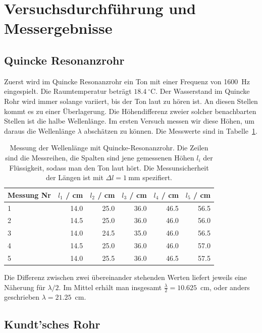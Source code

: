 \documentclass{article}
\begin{document}
\newpage
\section{Versuchsdurchführung und Messergebnisse}


\subsection{Quincke Resonanzrohr}

Zuerst wird im Quincke Resonanzrohr ein Ton mit einer Frequenz von 1600~Hz eingespielt. Die Raumtemperatur beträgt $18.4~^\circ$C. Der Wasserstand im Quincke Rohr wird immer solange variiert, bis der Ton laut zu hören ist. An diesen Stellen kommt es zu einer Überlagerung. Die Höhendifferenz zweier solcher benachbarten Stellen ist die halbe Wellenlänge. Im ersten Versuch messen wir diese Höhen, um daraus die Wellenlänge $\lambda$ abschätzen zu können. Die Messwerte sind in Tabelle~\ref{tab:quincke_rohr}.

\begin{table}[H]
\caption{Messung der Wellenlänge mit Quincke-Resonanzrohr. Die Zeilen sind die Messreihen, die Spalten sind jene gemessenen Höhen $l_i$ der Flüssigkeit, sodass man den Ton laut hört. Die Messunsicherheit der Längen ist mit $\Delta l = 1~$mm spezifiert.}
\label{tab:quincke_rohr}
\begin{tabular}{l|rrrrr}
Messung Nr & $l_1$ / cm & $l_2$ / cm  &  $l_3$ / cm  &  $l_4$ / cm  & $l_5$ / cm  \\
\hline
1 & 14.0 &     25.0 &  			36.0 & 		46.5 &  	56.5 \\
2 & 14.5 &     25.0 &  		  	36.0 &		46.0 &  56.0 \\
3 & 14.0 & 		24.5 &     		35.0 &		46.0 &  56.5 \\
4 & 14.5 & 		25.0 &	   		36.0 &  		46.0 &  57.0 \\
5 & 14.0 &  	25.5 &  			36.0 &		46.5 &  57.5 
\end{tabular}
\end{table}
Die Differenz zwischen zwei übereinander stehenden Werten liefert jeweils eine Näherung für $\lambda/2$. Im Mittel erhält man insgesamt $\frac{\lambda}{2} = 10.625$~cm, oder anders geschrieben $\lambda = 21.25$~cm.



\subsection{Kundt'sches Rohr}
\end{document}

